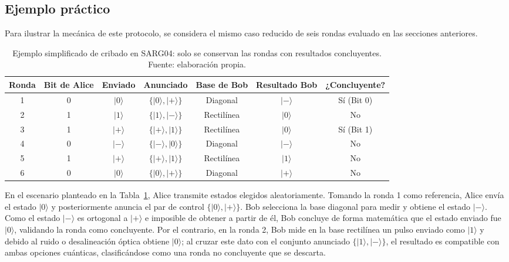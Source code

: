 \subsection{Ejemplo práctico}
Para ilustrar la mecánica de este protocolo, se considera el mismo caso reducido de seis rondas evaluado en las secciones anteriores.

\begin{table}[h]
\centering
\small
\begin{tabular}{c c c c c c c}
\hline\hline
Ronda & Bit de Alice & Enviado & Anunciado & Base de Bob & Resultado Bob & ¿Concluyente? \\
\hline
1 & 0 & $|0\rangle$ & $\{|0\rangle,|+\rangle\}$ & Diagonal & $|-\rangle$ & Sí (Bit 0) \\
2 & 1 & $|1\rangle$ & $\{|1\rangle,|-\rangle\}$ & Rectilínea & $|0\rangle$ & No \\
3 & 1 & $|+\rangle$ & $\{|+\rangle,|1\rangle\}$ & Rectilínea & $|0\rangle$ & Sí (Bit 1) \\
4 & 0 & $|-\rangle$ & $\{|-\rangle,|0\rangle\}$ & Diagonal & $|-\rangle$ & No \\
5 & 1 & $|+\rangle$ & $\{|+\rangle,|1\rangle\}$ & Rectilínea & $|1\rangle$ & No \\
6 & 0 & $|0\rangle$ & $\{|0\rangle,|+\rangle\}$ & Diagonal & $|+\rangle$ & No \\
\hline
\end{tabular}
\caption[Ejemplo de cribado en SARG04]{Ejemplo simplificado de cribado en SARG04: solo se conservan las rondas con resultados concluyentes. Fuente: elaboración propia.}
\label{tab:sarg04_ejemplo}
\end{table}

En el escenario planteado en la Tabla~\ref{tab:sarg04_ejemplo}, Alice transmite estados elegidos aleatoriamente. Tomando la ronda 1 como referencia, Alice envía el estado $|0\rangle$ y posteriormente anuncia el par de control $\{|0\rangle, |+\rangle\}$. Bob selecciona la base diagonal para medir y obtiene el estado $|-\rangle$. Como el estado $|-\rangle$ es ortogonal a $|+\rangle$ e imposible de obtener a partir de él, Bob concluye de forma matemática que el estado enviado fue $|0\rangle$, validando la ronda como concluyente. Por el contrario, en la ronda 2, Bob mide en la base rectilínea un pulso enviado como $|1\rangle$ y debido al ruido o desalineación óptica obtiene $|0\rangle$; al cruzar este dato con el conjunto anunciado $\{|1\rangle, |-\rangle\}$, el resultado es compatible con ambas opciones cuánticas, clasificándose como una ronda no concluyente que se descarta. 


